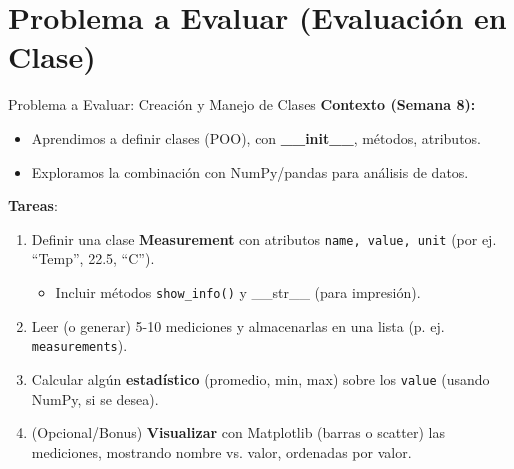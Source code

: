 \documentclass[10pt]{beamer}
\begin{document}
\section{Problema a Evaluar (Evaluación en Clase)}

\begin{frame}{Problema a Evaluar: Creación y Manejo de Clases}
  \textbf{Contexto (Semana 8):}
  \begin{itemize}
    \item Aprendimos a definir clases (POO), con \textbf{\_\_init\_\_}, métodos, atributos.
    \item Exploramos la combinación con NumPy/pandas para análisis de datos.
  \end{itemize}

  \textbf{Tareas}:
  \begin{enumerate}
    \item Definir una clase \textbf{Measurement} con atributos \texttt{name, value, unit} (por ej. “Temp”, 22.5, “C”).
      \begin{itemize}
        \item Incluir métodos \texttt{show\_info()} y \_\_str\_\_ (para impresión).
      \end{itemize}
    \item Leer (o generar) 5-10 mediciones y almacenarlas en una lista (p. ej. \texttt{measurements}).
    \item Calcular algún \textbf{estadístico} (promedio, min, max) sobre los \texttt{value} (usando NumPy, si se desea).
    \item (Opcional/Bonus) \textbf{Visualizar} con Matplotlib (barras o scatter) las mediciones, mostrando nombre vs. valor, ordenadas por valor.
  \end{enumerate}
\end{frame}
\end{document}
